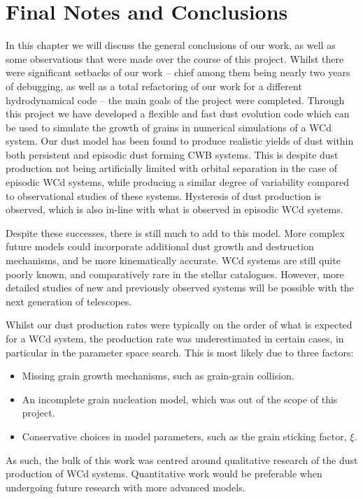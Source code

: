 \chapter{Final Notes and Conclusions}

In this chapter we will discuss the general conclusions of our work, as well as some observations that were made over the course of this project.
Whilst there were significant setbacks of our work -- chief among them being nearly two years of debugging, as well as a total refactoring of our work for a different hydrodynamical code -- the main goals of the project were completed.
Through this project we have developed a flexible and fast dust evolution code which can be used to simulate the growth of grains in numerical simulations of a WCd system.
Our dust model has been found to produce realistic yields of dust within both persistent and episodic dust forming CWB systems.
This is despite dust production not being artificially limited with orbital separation in the case of episodic WCd systems, while producing a similar degree of variability compared to observational studies of these systems.
Hysteresis of dust production is observed, which is also in-line with what is observed in episodic WCd systems.

Despite these successes, there is still much to add to this model.
More complex future models could incorporate additional dust growth and destruction mechanisms, and be more kinematically accurate.
WCd systems are still quite poorly known, and comparatively rare in the stellar catalogues.
However, more detailed studies of new and previously observed systems will be possible with the next generation of telescopes.

Whilst our dust production rates were typically on the order of what is expected for a WCd system, the production rate was underestimated in certain cases, in particular in the parameter space search.
This is most likely due to three factors:

\begin{itemize}
  \item Missing grain growth mechanisms, such as grain-grain collision.
  \item An incomplete grain nucleation model, which was out of the scope of this project.
  \item Conservative choices in model parameters, such as the grain sticking factor, $\xi$.
\end{itemize}

\noindent
As such, the bulk of this work was centred around qualitative research of the dust production of WCd systems.
Quantitative work would be preferable when undergoing future research with more advanced models.

